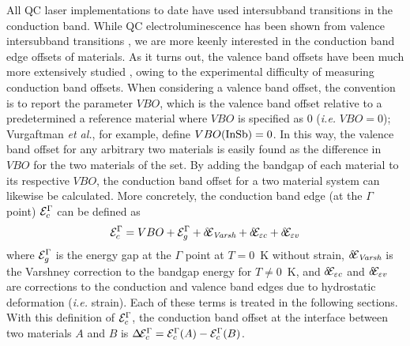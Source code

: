 \documentclass[12pt]{report}
\begin{document}
All QC laser implementations to date have used intersubband transitions in the conduction band.  While QC electroluminescence has been shown from valence intersubband transitions \cite{Dehlinger:Science:2000:Sige} \cite{Malis:APL:2006}, we are more keenly interested in the conduction band edge offsets of materials.  As it turns out, the valence band offsets have been much more extensively studied \cite{Vurgaftman}, owing to the experimental difficulty of measuring conduction band offsets.  When considering a valence band offset, the convention is to report the parameter $VBO$, which is the valence band offset relative to a predetermined a reference material where $VBO$ is specified as 0 (\emph{i.e.} $VBO=0$); Vurgaftman \emph{et al.}, for example, define $VBO(\textnormal{InSb})=0$.  In this way, the valence band offset for any arbitrary two materials is easily found as the difference in $VBO$ for the two materials of the set.  By adding the bandgap of each material to its respective $VBO$, the conduction band offset for a two material system can likewise be calculated.  More concretely, the conduction band edge (at the $\Gamma$ point) $\EE_c^\Gamma$ can be defined as
\begin{equation}
\EE_c^\Gamma = VBO + \EE_g^\Gamma + \delta\!\EE_\textit{Varsh} + \delta\!\EE_{\varepsilon c} + \delta\!\EE_{\varepsilon v}
\end{equation}
where $\EE_g^\Gamma$ is the energy gap at the $\Gamma$ point at $T=0$~K without strain, $\delta\!\EE_\textit{Varsh}$ is the Varshney correction to the bandgap energy for $T\neq0$~K, and $\delta\!\EE_{\varepsilon c}$ and $\delta\!\EE_{\varepsilon v}$ are corrections to the conduction and valence band edges due to hydrostatic deformation (\emph{i.e.} strain).  Each of these terms is treated in the following sections.  With this definition of $\EE_c^\Gamma$, the conduction band offset at the interface between two materials $A$ and $B$ is $\Delta\!\EE_c^\Gamma=\EE_c^\Gamma(A)-\EE_c^\Gamma(B)$.

\end{document}
